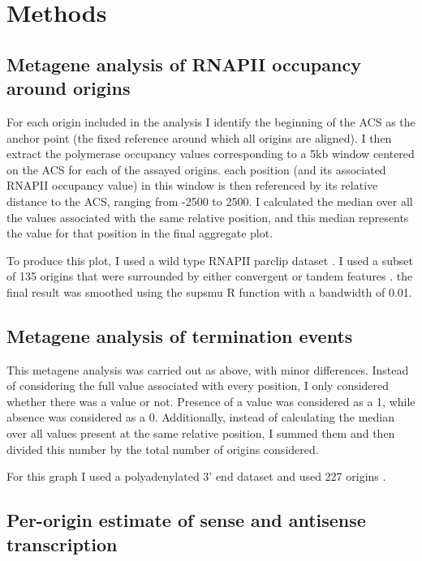 \chapter*{\textbf{Methods}}

\section*{Metagene analysis of RNAPII occupancy around origins}
For each origin included in the analysis I identify the beginning of the ACS as the anchor point (the fixed reference around which all origins are aligned). I then extract the polymerase occupancy values corresponding to a 5kb window centered on the ACS for each of the assayed origins. each position (and its associated RNAPII occupancy value) in this window is then referenced by its relative distance to the ACS, ranging from -2500 to 2500. I calculated the median over all the values associated with the same relative position, and this median represents the value for that position in the final aggregate plot.

To produce this plot, I used a wild type RNAPII parclip dataset \cite{schaughency:2014:genomewide}. I used a subset of 135 origins \cite{nieduszynski:2006:genomewide} that were surrounded by either convergent or tandem features \cite{xu:2009:bidirectional}. the final result was smoothed using the supsmu R function \cite{rproject} with a bandwidth of 0.01.

\section*{Metagene analysis of termination events}

This metagene analysis was carried out as above, with minor differences. Instead of considering the full value associated with every position, I only considered whether there was a value or not. Presence of a value was considered as a 1, while absence was considered as a 0. Additionally, instead of calculating the median over all values present at the same relative position, I summed them and then divided this number by the total number of origins considered.

For this graph I used a polyadenylated 3’ end dataset \cite{wilkening:2013:efficient} and used 227 origins \cite{nieduszynski:2006:genomewide}.

\section*{Per-origin estimate of sense and antisense transcription}

